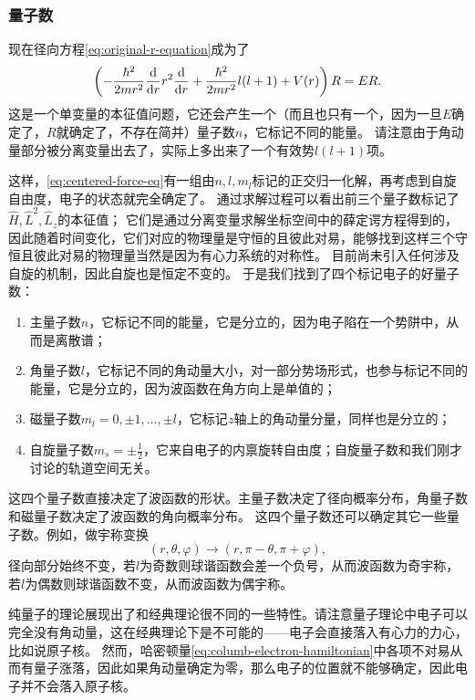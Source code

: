 \documentclass[UTF8, a4paper]{ctexart}
\begin{document}
\subsubsection{量子数}\label{sec:quantum-number}

现在径向方程\eqref{eq:original-r-equation}成为了
\begin{equation}
    \left( - \frac{\hbar^2}{2m r^2} \dv{r} r^2 \dv{r} + \frac{\hbar^2}{2m r^2} l(l+1) + V(r) \right) R = E R.
    \label{eq:r-equation}
\end{equation}
这是一个单变量的本征值问题，它还会产生一个（而且也只有一个，因为一旦$E$确定了，$R$就确定了，不存在简并）量子数$n$，它标记不同的能量。
请注意由于角动量部分被分离变量出去了，实际上多出来了一个有效势$l(l+1)$项。

这样，\eqref{eq:centered-force-eq}有一组由$n, l, m_l$标记的正交归一化解，再考虑到自旋自由度，电子的状态就完全确定了。
通过求解过程可以看出前三个量子数标记了$\hat{H}, \hat{L}^2, \hat{L}_z$的本征值；
它们是通过分离变量求解坐标空间中的薛定谔方程得到的，因此随着时间变化，它们对应的物理量是守恒的且彼此对易，能够找到这样三个守恒且彼此对易的物理量当然是因为有心力系统的对称性。
目前尚未引入任何涉及自旋的机制，因此自旋也是恒定不变的。
于是我们找到了四个标记电子的好量子数：
\begin{enumerate}
    \item 主量子数$n$，它标记不同的能量，它是分立的，因为电子陷在一个势阱中，从而是离散谱；
    \item 角量子数$l$，它标记不同的角动量大小，对一部分势场形式，也参与标记不同的能量，它是分立的，因为波函数在角方向上是单值的；
    \item 磁量子数$m_l = 0, \pm 1, \ldots, \pm l$，它标记$z$轴上的角动量分量，同样也是分立的；
    \item 自旋量子数$m_s = \pm \frac{1}{2}$，它来自电子的内禀旋转自由度；自旋量子数和我们刚才讨论的轨道空间无关。
\end{enumerate}

这四个量子数直接决定了波函数的形状。主量子数决定了径向概率分布，角量子数和磁量子数决定了波函数的角向概率分布。
这四个量子数还可以确定其它一些量子数。例如，做宇称变换
\[
    (r, \theta, \varphi) \longrightarrow (r, \pi - \theta, \pi + \varphi),
\]
径向部分始终不变，若$l$为奇数则球谐函数会差一个负号，从而波函数为奇宇称，若$l$为偶数则球谐函数不变，从而波函数为偶宇称。

纯量子的理论展现出了和经典理论很不同的一些特性。请注意量子理论中电子可以完全没有角动量，这在经典理论下是不可能的——电子会直接落入有心力的力心，比如说原子核。
然而，哈密顿量\eqref{eq:columb-electron-hamiltonian}中各项不对易从而有量子涨落，因此如果角动量确定为零，那么电子的位置就不能够确定，因此电子并不会落入原子核。
\end{document}
